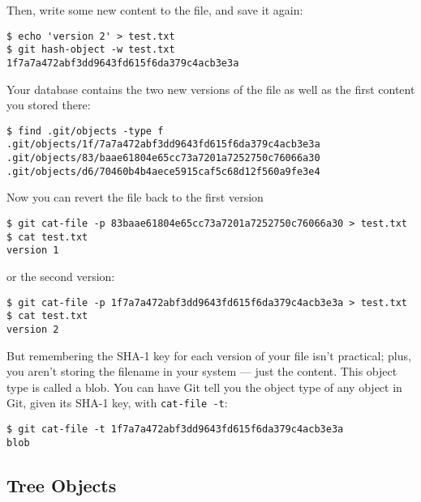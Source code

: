 \documentclass[a4paper]{book}
\newcounter{tab}[chapter]
\begin{document}
Then, write some new content to the file, and save it again:

\begin{shaded}\begin{verbatim}
$ echo 'version 2' > test.txt
$ git hash-object -w test.txt
1f7a7a472abf3dd9643fd615f6da379c4acb3e3a
\end{verbatim}\end{shaded}

Your database contains the two new versions of the file as well as the first content you stored there:

\begin{shaded}\begin{verbatim}
$ find .git/objects -type f
.git/objects/1f/7a7a472abf3dd9643fd615f6da379c4acb3e3a
.git/objects/83/baae61804e65cc73a7201a7252750c76066a30
.git/objects/d6/70460b4b4aece5915caf5c68d12f560a9fe3e4
\end{verbatim}\end{shaded}

Now you can revert the file back to the first version

\begin{shaded}\begin{verbatim}
$ git cat-file -p 83baae61804e65cc73a7201a7252750c76066a30 > test.txt
$ cat test.txt
version 1
\end{verbatim}\end{shaded}

or the second version:

\begin{shaded}\begin{verbatim}
$ git cat-file -p 1f7a7a472abf3dd9643fd615f6da379c4acb3e3a > test.txt
$ cat test.txt
version 2
\end{verbatim}\end{shaded}

But remembering the SHA-1 key for each version of your file isn't practical; plus, you aren't storing the filename in your system --- just the content. This object type is called a blob. You can have Git tell you the object type of any object in Git, given its SHA-1 key, with \texttt{cat-file -t}:

\begin{shaded}\begin{verbatim}
$ git cat-file -t 1f7a7a472abf3dd9643fd615f6da379c4acb3e3a
blob
\end{verbatim}\end{shaded}

\subsection{Tree Objects}
\end{document}
